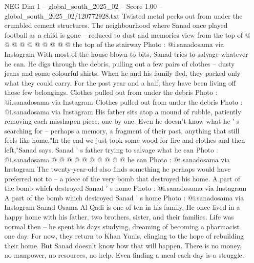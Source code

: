 \begin{textsample}{NEG Dim 1 – global\_south\_2025\_02 – Score 1.00 – global\_south\_2025\_02/120772928.txt}
Twisted metal peeks out from under the crumbled cement structures.
The neighbourhood where Sanad once played football as a child is gone -- reduced to dust and memories view from the top of @ @ @ @ @ @ @ @ @ @ the top of the stairway Photo : @i.sanadosama via Instagram With most of the house blown to bits, Sanad tries to salvage whatever he can.
He digs through the debris, pulling out a few pairs of clothes -- dusty jeans and some colourful shirts.
When he and his family fled, they packed only what they could carry.
For the past year and a half, they have been living off those few belongings.
Clothes pulled out from under the debris Photo : @i.sanadosama via Instagram Clothes pulled out from under the debris Photo : @i.sanadosama via Instagram His father sits atop a mound of rubble, patiently removing each misshapen piece, one by one.
Even he doesn't know what he ' s searching for -- perhaps a memory, a fragment of their past, anything that still feels like home."In the end we just took some wood for fire and clothes and then left,"Sanad says.
Sanad ' s father trying to salvage what he can Photo : @i.sanadosama @ @ @ @ @ @ @ @ @ @ he can Photo : @i.sanadosama via Instagram The twenty-year-old also finds something he perhaps would have preferred not to -- a piece of the very bomb that destroyed his home.
A part of the bomb which destroyed Sanad ' s home Photo : @i.sanadosama via Instagram A part of the bomb which destroyed Sanad ' s home Photo : @i.sanadosama via Instagram Sanad Osama Al-Qadi is one of ten in his family.
He once lived in a happy home with his father, two brothers, sister, and their families.
Life was normal then -- he spent his days studying, dreaming of becoming a pharmacist one day.
For now, they return to Khan Yunis, clinging to the hope of rebuilding their home.
But Sanad doesn't know how that will happen.
There is no money, no manpower, no resources, no help.
Even finding a meal each day is a struggle.

\end{textsample}
